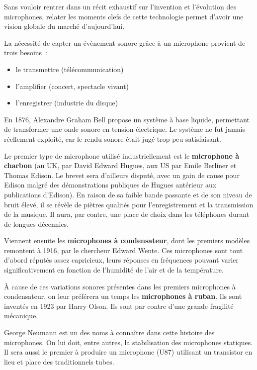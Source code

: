\documentclass[
]{book}
\providecommand{\tightlist}{%
  \setlength{\itemsep}{0pt}\setlength{\parskip}{0pt}}
\begin{document}
Sans vouloir rentrer dans un récit exhaustif sur l'invention et l'évolution des microphones, relater les moments clefs de cette technologie permet d'avoir une vision globale du marché d'aujourd'hui.

La nécessité de capter un évènement sonore grâce à un microphone provient de trois besoins~:

\begin{itemize}
\tightlist
\item
  le transmettre (télécommunication)
\item
  l'amplifier (concert, spectacle vivant)
\item
  l'enregistrer (industrie du disque)
\end{itemize}

En 1876, Alexandre Graham Bell propose un système à base liquide, permettant de transformer une onde sonore en tension électrique. Le système ne fut jamais réellement exploité, car le rendu sonore était jugé trop peu satisfaisant.

Le premier type de microphone utilisé industriellement est le \textbf{microphone à charbon} (au UK, par David Edward Hugues, aux US par Emile Berliner et Thomas Edison. Le brevet sera d'ailleurs disputé, avec un gain de cause pour Edison malgré des démonstrations publiques de Hugues antérieur aux publications d'Edison). En raison de sa faible bande passante et de son niveau de bruit élevé, il se révèle de piètres qualités pour l'enregistrement et la transmission de la musique. Il aura, par contre, une place de choix dans les téléphones durant de longues décennies.

Viennent ensuite les \textbf{microphones à condensateur}, dont les premiers modèles remontent à 1916, par le chercheur Edward Wente. Ces microphones sont tout d'abord réputés assez capricieux, leurs réponses en fréquences pouvant varier significativement en fonction de l'humidité de l'air et de la température.

À cause de ces variations sonores présentes dans les premiers microphones à condensateur, on leur préférera un temps les \textbf{microphones à ruban}. Ils sont inventés en 1923 par Harry Olson. Ils sont par contre d'une grande fragilité mécanique.

George Neumann est un des noms à connaître dans cette histoire des microphones. On lui doit, entre autres, la stabilisation des microphones statiques. Il sera aussi le premier à produire un microphone (U87) utilisant un transistor en lieu et place des traditionnels tubes.
\end{document}
